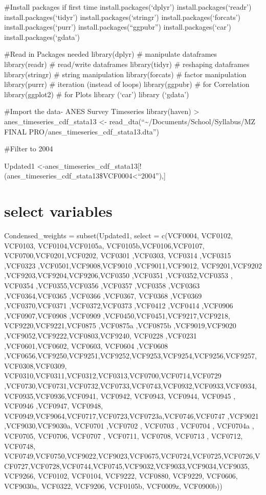 \documentclass[
]{article}
\author{}
\date{\vspace{-2.5em}}
\begin{document}
\#Install packages if first time install.packages(`dplyr')
install.packages(`readr') install.packages(`tidyr')
install.packages(`stringr') install.packages(`forcats')
install.packages(`purr') install.packages(``ggpubr'')
install.packages(`car') install.packages(`gdata')

\#Read in Packages needed library(dplyr) \# manipulate dataframes
library(readr) \# read/write dataframes library(tidyr) \# reshaping
dataframes library(stringr) \# string manipulation library(forcats) \#
factor manipulation library(purrr) \# iteration (instead of loops)
library(ggpubr) \# for Correlation library(ggplot2) \# for Plots library
(`car') library (`gdata')

\#Import the data- ANES Survey Timeseries library(haven) \textgreater{}
anes\_timeseries\_cdf\_stata13 \textless-
read\_dta(``\textasciitilde/Documents/School/Syllabus/MZ FINAL
PRO/anes\_timeseries\_cdf\_stata13.dta'')

\#Filter to 2004

Updated1
\textless-anes\_timeseries\_cdf\_stata13{[}!(anes\_timeseries\_cdf\_stata13\$VCF0004\textless{}``2004''),{]}

\hypertarget{select-variables}{%
\section{select variables}\label{select-variables}}

Condensed\_weights = subset(Updated1, select = c(VCF0004, VCF0102,
VCF0103, VCF0104,VCF0105a, VCF0105b,VCF0106,VCF0107,
VCF0700,VCF0201,VCF0202, VCF0301 ,VCF0303, VCF0314 ,VCF0315 ,VCF0323
,VCF0501,VCF9008,VCF9010 ,VCF9011,VCF9012, VCF9201,VCF9202
,VCF9203,VCF9204,VCF9206,VCF0350 ,VCF0351 ,VCF0352,VCF0353 , VCF0354
,VCF0355,VCF0356 ,VCF0357 ,VCF0358 ,VCF0363 ,VCF0364,VCF0365 ,VCF0366
,VCF0367, VCF0368 ,VCF0369 ,VCF0370,VCF0371 ,VCF0372,VCF0373 ,VCF0412
,VCF0414 ,VCF0906 ,VCF0907,VCF0908 ,VCF0909
,VCF0450,VCF0451,VCF9217,VCF9218, VCF9220,VCF9221,VCF0875 ,VCF0875a
,VCF0875b ,VCF9019,VCF9020 ,VCF9052,VCF9222,VCF0803,VCF9240, VCF0228
,VCF0231 ,VCF0601,VCF0602, VCF0603, VCF0604 ,VCF0608
,VCF0656,VCF9250,VCF9251,VCF9252,VCF9253,VCF9254,VCF9256,VCF9257,VCF0308,VCF0309,
VCF0310,VCF0311,VCF0312,VCF0313,VCF0700,VCF0714,VCF0729
,VCF0730,VCF0731,VCF0732,VCF0733,VCF0743,VCF0932,VCF0933,VCF0934,VCF0935,VCF0936,VCF0941,
VCF0942, VCF0943, VCF0944, VCF0945 , VCF0946 ,VCF0947, VCF0948,
VCF0949,VCF9064,VCF0717,VCF0723,VCF0723a,VCF0746,VCF0747 ,VCF9021
,VCF9030,VCF9030a, VCF0701 ,VCF0702 , VCF0703 , VCF0704 , VCF0704a ,
VCF0705, VCF0706, VCF0707 , VCF0711, VCF0708, VCF0713 , VCF0712,
VCF0748,
VCF0749,VCF0750,VCF9022,VCF9023,VCF0675,VCF0724,VCF0725,VCF0726,VCF0727,VCF0728,VCF0744,VCF0745,VCF9032,VCF9033,VCF9034,VCF9035,
VCF9266, VCF0102, VCF0104, VCF9222, VCF0880, VCF9229, VCF0606, VCF9030a,
VCF0322, VCF9206, VCF0105b, VCF0009z, VCF0900b))
\end{document}
